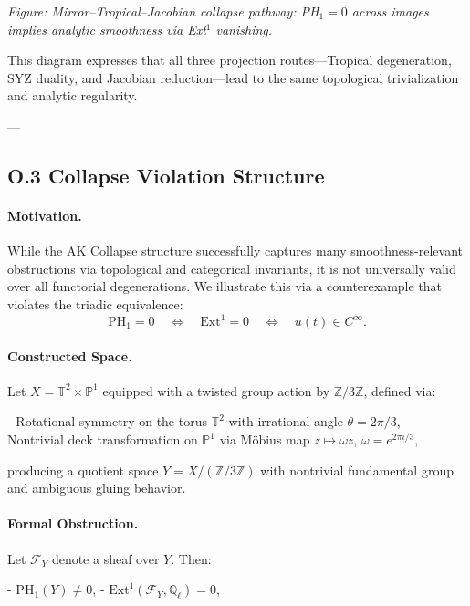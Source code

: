 \documentclass[11pt]{article}
\begin{document}
\begin{axiom}
\begin{axiom}
{{\begin{minipage}{\textwidth}
\small\textit{Figure: Mirror–Tropical–Jacobian collapse pathway: PH$_1 = 0$ across images implies analytic smoothness via Ext$^1$ vanishing.}
\end{minipage}

This diagram expresses that all three projection routes—Tropical degeneration, SYZ duality, and Jacobian reduction—lead to the same topological trivialization and analytic regularity.

---

\subsection*{O.3 Collapse Violation Structure}

\paragraph{Motivation.}
While the AK Collapse structure successfully captures many smoothness-relevant obstructions via topological and categorical invariants, it is not universally valid over all functorial degenerations. We illustrate this via a counterexample that violates the triadic equivalence:  
\[
\mathrm{PH}_1 = 0 \quad \Leftrightarrow \quad \mathrm{Ext}^1 = 0 \quad \Leftrightarrow \quad u(t) \in C^\infty.
\]

\paragraph{Constructed Space.}
Let \( X = \mathbb{T}^2 \times \mathbb{P}^1 \) equipped with a twisted group action by \( \mathbb{Z}/3\mathbb{Z} \), defined via:

- Rotational symmetry on the torus \( \mathbb{T}^2 \) with irrational angle \( \theta = 2\pi/3 \),
- Nontrivial deck transformation on \( \mathbb{P}^1 \) via Möbius map \( z \mapsto \omega z \), \( \omega = e^{2\pi i/3} \),

producing a quotient space \( Y = X / (\mathbb{Z}/3\mathbb{Z}) \) with nontrivial fundamental group and ambiguous gluing behavior.

\paragraph{Formal Obstruction.}
Let \( \mathcal{F}_Y \) denote a sheaf over \( Y \). Then:

- \( \mathrm{PH}_1(Y) \neq 0 \),
- \( \mathrm{Ext}^1(\mathcal{F}_Y, \mathbb{Q}_\ell) = 0 \),

}}
\end{axiom}
\end{axiom}
\end{document}
